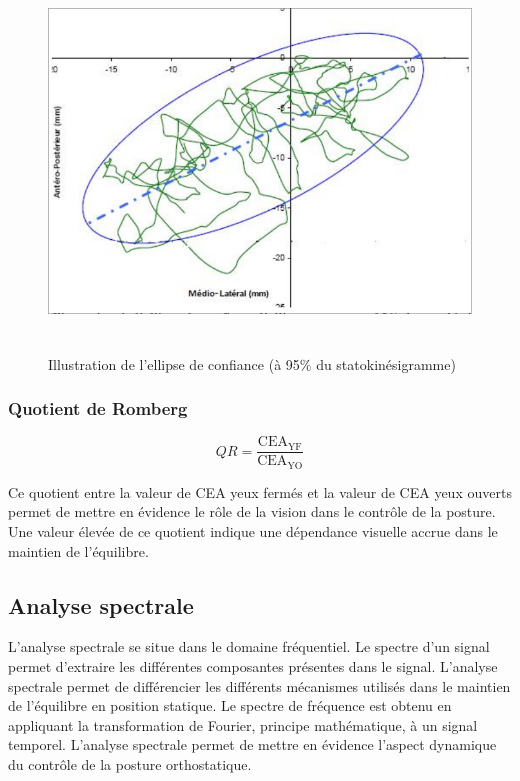 \begin{figure}[ht]
    \centering
    \includegraphics[height=10cm]{images/methode/ellipse_confiance_95.png}
    \caption{Illustration de l'ellipse de confiance (à 95\% du statokinésigramme)}\label{fig:ellipse_confiance}
\end{figure}

\subsubsection{Quotient de Romberg}

\[
QR = \frac{\text{CEA}_{\text{YF}}}{\text{CEA}_{\text{YO}}}\tag{14}
\]

Ce quotient entre la valeur de CEA yeux fermés et la valeur de CEA yeux ouverts permet de mettre en évidence le rôle de la vision dans le contrôle de la posture. 
Une valeur élevée de ce quotient indique une dépendance visuelle accrue dans le maintien de l'équilibre.

\subsection{Analyse spectrale}

L'analyse spectrale se situe dans le domaine fréquentiel. 
Le spectre d'un signal permet d'extraire les différentes composantes présentes dans le signal. 
L'analyse spectrale permet de différencier les différents mécanismes utilisés dans le maintien de l'équilibre en position statique.
Le spectre de fréquence est obtenu en appliquant la transformation de Fourier, principe mathématique, à un signal temporel. 
L'analyse spectrale permet de mettre en évidence l'aspect dynamique du contrôle de la posture orthostatique.

